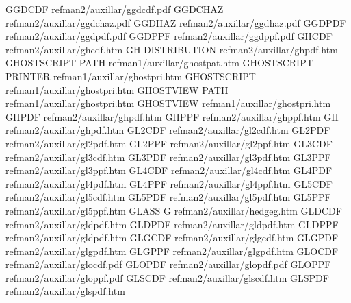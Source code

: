 GGDCDF                                  refman2/auxillar/ggdcdf.pdf
GGDCHAZ                                 refman2/auxillar/ggdchaz.pdf
GGDHAZ                                  refman2/auxillar/ggdhaz.pdf
GGDPDF                                  refman2/auxillar/ggdpdf.pdf
GGDPPF                                  refman2/auxillar/ggdppf.pdf
GHCDF                                   refman2/auxillar/ghcdf.htm
GH DISTRIBUTION                         refman2/auxillar/ghpdf.htm
GHOSTSCRIPT PATH                        refman1/auxillar/ghostpat.htm
GHOSTSCRIPT PRINTER                     refman1/auxillar/ghostpri.htm
GHOSTSCRIPT                             refman1/auxillar/ghostpri.htm
GHOSTVIEW PATH                          refman1/auxillar/ghostpri.htm
GHOSTVIEW                               refman1/auxillar/ghostpri.htm
GHPDF                                   refman2/auxillar/ghpdf.htm
GHPPF                                   refman2/auxillar/ghppf.htm
GH                                      refman2/auxillar/ghpdf.htm
GL2CDF                                  refman2/auxillar/gl2cdf.htm
GL2PDF                                  refman2/auxillar/gl2pdf.htm
GL2PPF                                  refman2/auxillar/gl2ppf.htm
GL3CDF                                  refman2/auxillar/gl3cdf.htm
GL3PDF                                  refman2/auxillar/gl3pdf.htm
GL3PPF                                  refman2/auxillar/gl3ppf.htm
GL4CDF                                  refman2/auxillar/gl4cdf.htm
GL4PDF                                  refman2/auxillar/gl4pdf.htm
GL4PPF                                  refman2/auxillar/gl4ppf.htm
GL5CDF                                  refman2/auxillar/gl5cdf.htm
GL5PDF                                  refman2/auxillar/gl5pdf.htm
GL5PPF                                  refman2/auxillar/gl5ppf.htm
GLASS G                                 refman2/auxillar/hedgeg.htm
GLDCDF                                  refman2/auxillar/gldpdf.htm
GLDPDF                                  refman2/auxillar/gldpdf.htm
GLDPPF                                  refman2/auxillar/gldpdf.htm
GLGCDF                                  refman2/auxillar/glgcdf.htm
GLGPDF                                  refman2/auxillar/glgpdf.htm
GLGPPF                                  refman2/auxillar/glgpdf.htm
GLOCDF                                  refman2/auxillar/glocdf.pdf
GLOPDF                                  refman2/auxillar/glopdf.pdf
GLOPPF                                  refman2/auxillar/gloppf.pdf
GLSCDF                                  refman2/auxillar/glscdf.htm
GLSPDF                                  refman2/auxillar/glspdf.htm
